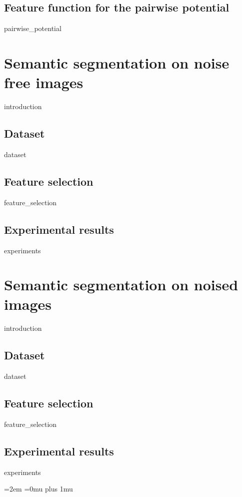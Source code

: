 \documentclass[12pt]{report}
\begin{document}
\subsection{Feature function for the pairwise potential}
{pairwise_potential}

\section{Semantic segmentation on noise free images}
{introduction} 
    
    \subsection{Dataset}
    {dataset}
 
    \subsection{Feature selection}
    \label{sec:feature_selection_noise_free}
    {feature_selection}
    
    \subsection{Experimental results}	
        {experiments}

\section{Semantic segmentation on noised images}
{introduction} 
     \subsection{Dataset}
    {dataset}
 
    \subsection{Feature selection}
    \label{sec:feature_selection_noise}
    {feature_selection}
    
    \subsection{Experimental results}	
        {experiments}
    




\newpage
\emergencystretch=2em
\Urlmuskip=0mu plus 1mu\relax
\printbibliography 
\end{document}
